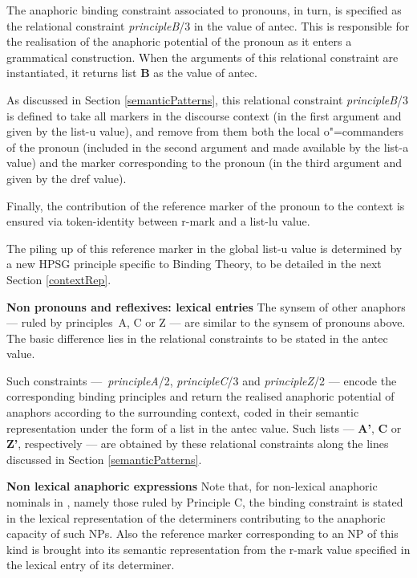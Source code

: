 \documentclass[output=paper
	        ,collection
	        ,collectionchapter
 	        ,biblatex
                ,babelshorthands
                ,newtxmath
                ,draftmode
                ,colorlinks, citecolor=brown
]{langscibook}
\begin{document}
The anaphoric binding constraint associated to pronouns, in turn,
is specified as the relational constraint \textit {principleB}/3
in the value of {\sc antec}.  
This is responsible for the realisation of
the anaphoric potential of the pronoun as it enters a grammatical
construction. When the arguments of this relational constraint are instantiated,
it returns list {\bf B} as the value of {\sc antec}. 

As discussed in Section \ref{semanticPatterns}, this relational constraint \textit {principleB}/3 
is defined to take 
all markers in the discourse context (in the first argument and given 
by the {\sc list-u} value), and remove from them both the local \mbox{o"=commanders}  
of the pronoun (included in the second argument and made available by the {\sc list-a}
value)  and the marker corresponding to the pronoun (in the third  argument and
given by the {\sc dref} value).

Finally, the contribution of the reference marker of the pronoun
to the context is ensured via token-identity
between {\sc r-mark} and a {\sc list-lu} value.

The piling up of this reference
marker in the global {\sc list-u} value is determined
by a new HPSG principle specific to Binding Theory, to be detailed in the next Section \ref{contextRep}.

\textbf{Non pronouns and reflexives: lexical entries} The {\sc synsem} of other anaphors --- ruled by principles~A, C or Z --- are 
similar to the {\sc synsem} of pronouns above. The basic difference lies in the
relational constraints to be stated in the {\sc antec} value.

Such constraints  
---~{\it principleA}/2, {\it principleC}/3 and {\it principleZ}/2 --- encode the 
corresponding binding principles and return the realised
anaphoric potential of anaphors according to the surrounding context,
coded in their semantic representation under the form
of a list in the {\sc antec} value. Such 
lists --- {\bf A'}, {\bf C} or {\bf Z'}, respectively --- are obtained 
by these relational constraints along the lines
discussed in Section \ref{semanticPatterns}.

\textbf{Non lexical anaphoric expressions} Note that, for non-lexical anaphoric nominals in , namely those ruled
by Principle C, the binding constraint is stated in the lexical representation
of the determiners contributing to the anaphoric capacity of such NPs.
Also the reference marker corresponding to an NP of this kind is brought into 
its semantic representation from the {\sc r-mark} value
specified in the lexical entry of its determiner.
\end{document}
